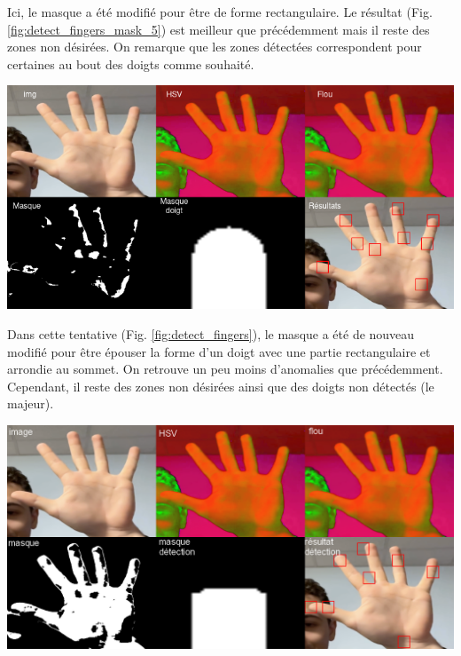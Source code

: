 \documentclass[11pt]{article}
\begin{document}
Ici, le masque a été modifié pour être de forme rectangulaire. Le résultat (Fig. \ref{fig:detect_fingers_mask_5}) est meilleur que précédemment mais il reste des zones non désirées.
On remarque que les zones détectées correspondent pour certaines au bout des doigts comme souhaité.


\begin{center}
    \includegraphics[width=\textwidth]{images/detect_fingers.png}
    \label{fig:detect_fingers}
\end{center}

Dans cette tentative (Fig. \ref{fig:detect_fingers}), le masque a été de nouveau modifié pour être épouser la forme d'un doigt avec une partie rectangulaire et arrondie au sommet. On retrouve un peu moins d'anomalies que précédemment. Cependant, il reste des zones non désirées ainsi que des doigts non détectés (le majeur).


\begin{center}
    \includegraphics[width=\textwidth]{images/detect_fingers_mask_2.png}
    \label{fig:detect_fingers_mask_2}
\end{center}
\end{document}
